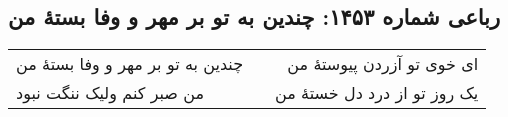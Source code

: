 \begin{center}
\section*{رباعی شماره ۱۴۵۳: چندین به تو بر مهر و وفا بستهٔ من}
\label{sec:1453}
\begin{longtable}{l p{0.5cm} r}
چندین به تو بر مهر و وفا بستهٔ من
&&
ای خوی تو آزردن پیوستهٔ من
\\
من صبر کنم ولیک ننگت نبود
&&
یک روز تو از درد دل خستهٔ من
\\
\end{longtable}
\end{center}
